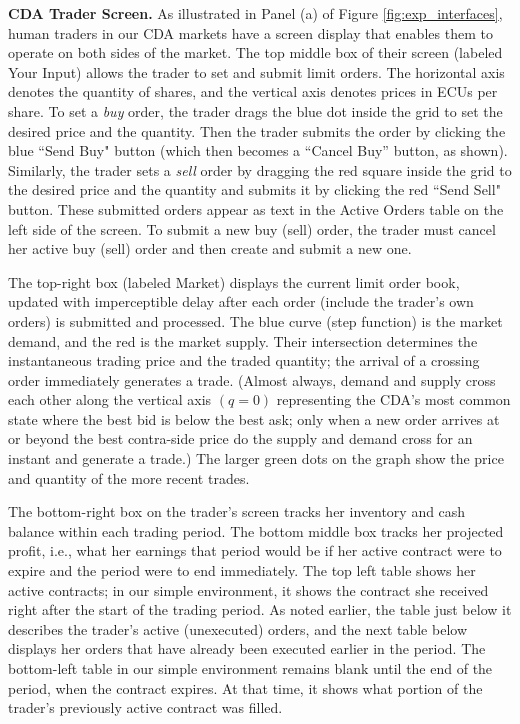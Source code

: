 \documentclass[12pt]{article}
\begin{document}
\bigskip
\noindent
\textbf{CDA Trader Screen.}
As illustrated 
in Panel (a) of Figure \ref{fig:exp_interfaces}, human traders in our CDA markets have a screen display that enables them to operate on both sides of the market.
The top middle box of their screen
(labeled Your Input) allows the trader to set and submit limit orders. The horizontal axis denotes the quantity of shares, and the vertical axis denotes prices in ECUs per share. To set a \textit{buy} order, the trader drags the blue dot inside the grid to set the desired price and the quantity. 
Then the trader submits the order by clicking the blue ``Send Buy" button (which then becomes a ``Cancel Buy'' button, as shown). 
Similarly, the trader sets a \textit{sell} order by dragging the red square inside the grid to the desired price and the quantity and submits it by clicking the red  ``Send Sell" button. 
These submitted orders appear as  text in the Active Orders table on the left side of the screen. 
To submit a new buy (sell) order, the trader must cancel her active buy (sell) order and then create and submit a new one. 

The top-right box (labeled Market) displays the current limit order book, updated with imperceptible delay after each order 
(include the trader's own orders) is submitted and processed. 
The blue curve (step function) 
is the market demand, and the red is the market supply. Their intersection determines the instantaneous trading price and the traded quantity;
the arrival of a crossing order immediately generates a trade.
(Almost always, demand and supply cross each other along the vertical axis $(q=0)$ representing the CDA's most common state where the best bid is below the best ask; only when a new order arrives at or beyond the best contra-side price do the supply and demand cross for an instant and generate a trade.) 
The larger green dots on the graph show the price and quantity of the more recent trades.

The bottom-right box on the trader's screen tracks her inventory and cash balance within each trading period. 
The bottom middle box tracks her projected profit, i.e., what her earnings that period would be if her active contract were to expire and the period were to end immediately. 
The top left table shows her active contracts; in our simple environment, it shows the contract she received right after the start of the trading period. 
As noted earlier, the table just below it describes the trader's active (unexecuted) orders, and 
the next table below displays her orders that have already been executed earlier in the period. 
The bottom-left table in our simple environment remains blank until the end of the period, when the contract expires. At that time, it shows what portion of the trader's previously active contract was filled. 
\end{document}
